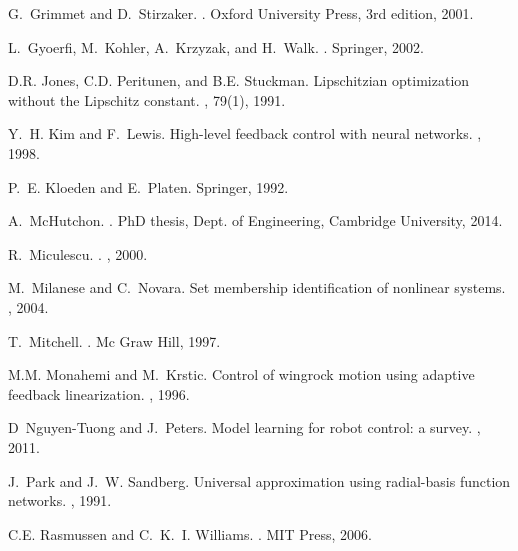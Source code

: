 \documentclass{article} %
\theoremstyle{definition}
\theoremstyle{remark}
\begin{document}
\begin{thebibliography}{10}
	G.~Grimmet and D.~Stirzaker.
	.
	\newblock Oxford University Press, 3rd edition, 2001.
	
	L.~Gyoerfi, M.~Kohler, A.~Krzyzak, and H.~Walk.
	.
	\newblock Springer, 2002.
	
	D.R. Jones, C.D. Peritunen, and B.E. Stuckman.
	\newblock Lipschitzian optimization without the {Lipschitz} constant.
	, 79(1), 1991.
	
	Y.~H. Kim and F.~Lewis.
	\newblock High-level feedback control with neural networks.
	, 1998.
	
	P.~E. Kloeden and E.~Platen.
	\newblock Springer, 1992.
	
	A.~McHutchon.
	.
	\newblock PhD thesis, Dept. of Engineering, Cambridge University, 2014.
	
	R.~Miculescu.
	.
	, 2000.
	
	M.~Milanese and C.~Novara.
	\newblock Set membership identification of nonlinear systems.
	, 2004.
	
	T.~Mitchell.
	.
	\newblock Mc Graw Hill, 1997.
	
	M.M. Monahemi and M.~Krstic.
	\newblock Control of wingrock motion using adaptive feedback linearization.
	, 1996.
	
	D~Nguyen-Tuong and J.~Peters.
	\newblock Model learning for robot control: a survey.
	, 2011.
	
	J.~Park and J.~W. Sandberg.
	\newblock Universal approximation using radial-basis function networks.
	, 1991.
	
	C.E. Rasmussen and C.~K.~I. Williams.
	.
	\newblock MIT Press, 2006.
	

\end{thebibliography}
\end{document}
